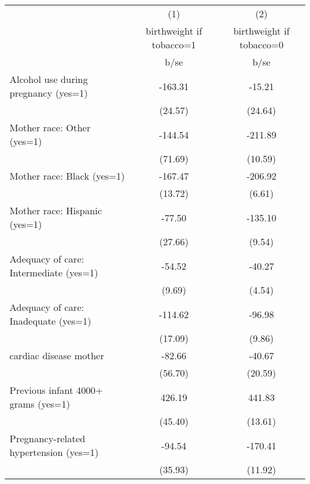 \begin{tabular}{l*{2}{c}}
\hline\hline
                                                  &\multicolumn{1}{c}{(1)}&\multicolumn{1}{c}{(2)}\\
                                                  &\multicolumn{1}{c}{birthweight if tobacco=1}&\multicolumn{1}{c}{birthweight if tobacco=0}\\
                                                  &        b/se&        b/se\\
\hline
Alcohol use during pregnancy (yes=1)              &     -163.31&      -15.21\\
                                                  &     (24.57)&     (24.64)\\
Mother race: Other (yes=1)                        &     -144.54&     -211.89\\
                                                  &     (71.69)&     (10.59)\\
Mother race: Black (yes=1)                        &     -167.47&     -206.92\\
                                                  &     (13.72)&      (6.61)\\
Mother race: Hispanic (yes=1)                     &      -77.50&     -135.10\\
                                                  &     (27.66)&      (9.54)\\
Adequacy of care: Intermediate (yes=1)            &      -54.52&      -40.27\\
                                                  &      (9.69)&      (4.54)\\
Adequacy of care: Inadequate (yes=1)              &     -114.62&      -96.98\\
                                                  &     (17.09)&      (9.86)\\
cardiac disease mother                            &      -82.66&      -40.67\\
                                                  &     (56.70)&     (20.59)\\
Previous infant 4000+ grams (yes=1)               &      426.19&      441.83\\
                                                  &     (45.40)&     (13.61)\\
Pregnancy-related hypertension (yes=1)            &      -94.54&     -170.41\\
                                                  &     (35.93)&     (11.92)\\

\end{tabular}
